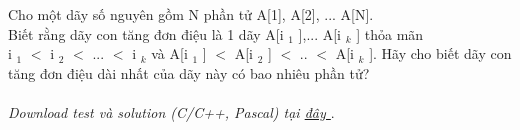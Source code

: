 Cho một dãy số nguyên gồm N phần tử A[1], A[2], ... A[N].   
\\   Biết rằng dãy con tăng đơn điệu là 1 dãy A[i   $_    1   $   ],... A[i   $_    k   $   ] thỏa mãn   
\\   i   $_    1   $   $<$ i   $_    2   $   $<$ ... $<$ i   $_    k   $   và A[i   $_    1   $   ] $<$ A[i   $_    2   $   ] $<$ .. $<$ A[i   $_    k   $   ]. Hãy cho biết dãy con tăng đơn điệu dài nhất của dãy này có bao nhiêu phần tử?   
\\
\\\textit{    Download test và solution (C/C++, Pascal) tại    \href{https://vn.spoj.pl/content/liq.zip}{     đây    }}   .  

\